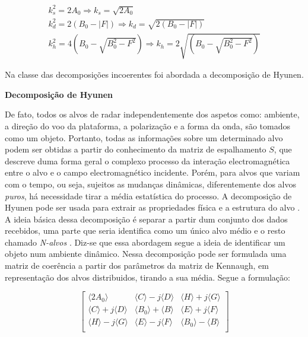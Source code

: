 \documentclass[a4paper,12pt]{article}
\begin{document}
\begin{equation}
    \begin{split}
            k^2_{s} = 2A_{0} \Rightarrow k_{s} = \sqrt{2A_{0}} \\ k^2_{d} = 2(B_{0}-|F|) \Rightarrow k_{d} = \sqrt{2(B_{0}-|F|)} \\
            k^2_{h} = 4(B_{0}-\sqrt{B^2_{0}-F^2}) \Rightarrow k_{h} = 2\sqrt{(B_{0}-\sqrt{B^2_{0}-F^2})}
    \end{split}
\end{equation}

Na classe das decomposições incoerentes foi abordada a decomposição de Hyunen.

\textbf{Decomposição de Hyunen}

De fato, todos os alvos de radar independentemente dos aspetos como: ambiente, a direção do voo da plataforma, a polarização e a forma da onda, são tomados como um objeto. Portanto, todas as informações sobre um determinado alvo podem ser obtidas a partir do conhecimento da matriz de espalhamento $S$, que descreve duma forma geral o complexo processo da interação electromagnética entre o alvo e o campo electromagnético incidente. Porém, para alvos que variam com o tempo, ou seja, sujeitos as mudanças dinâmicas, diferentemente dos alvos \textit{puros}, há necessidade tirar a média estatística do processo. A decomposição de Hyunen pode ser usada para extrair as propriedades física e a estrutura do alvo \cite{jong:2009}. A ideia básica dessa decomposição é separar a partir dum conjunto dos dados recebidos, uma parte que seria identifica como um único alvo médio e o resto chamado \textit{N-alvos} \cite{jong:2009}. Diz-se que essa abordagem segue a ideia de identificar um objeto num ambiente dinâmico. Nessa decomposição pode ser formulada uma matriz de coerência a partir dos parâmetros da matriz de Kennaugh, em representação dos alvos distribuidos, tirando a sua média. Segue a formulação:

\begin{equation}
    \begin{bmatrix}
        \langle2A_{0}\rangle & \langle C \rangle-j\langle D \rangle & \langle H \rangle+j\langle G \rangle\\
        \langle C \rangle+j\langle D \rangle & \langle B_{0} \rangle+\langle B \rangle & \langle E \rangle+j\langle F \rangle\\
        \langle H \rangle-j\langle G \rangle & \langle E \rangle-j\langle F \rangle & \langle B_{0} \rangle-\langle B \rangle\\
    \end{bmatrix}
\end{equation}
\end{document}
